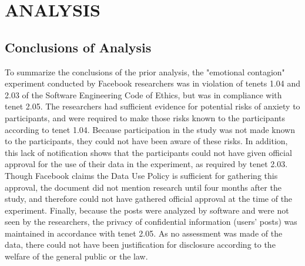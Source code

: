 \section{ANALYSIS}




\subsection{Conclusions of Analysis}
To summarize the conclusions of the prior analysis, the "emotional contagion" experiment conducted by Facebook researchers was in violation of tenets 1.04 and 2.03 of the Software Engineering Code of Ethics, but was in compliance with tenet 2.05.  The researchers had sufficient evidence for potential risks of anxiety to participants, and were required to make those risks known to the participants according to tenet 1.04.  Because participation in the study was not made known to the participants, they could not have been aware of these risks.  In addition, this lack of notification shows that the participants could not have given official approval for the use of their data in the experiment, as required by tenet 2.03.  Though Facebook claims the Data Use Policy is sufficient for gathering this approval, the document did not mention research until four months after the study, and therefore could not have gathered official approval at the time of the experiment.  Finally, because the posts were analyzed by software and were not seen by the researchers, the privacy of confidential information (users' posts) was maintained in accordance with tenet 2.05.  As no assessment was made of the data, there could not have been justification for disclosure according to the welfare of the general public or the law.